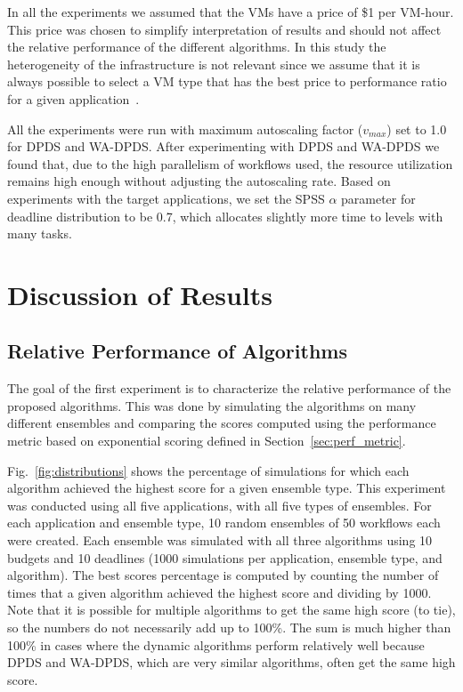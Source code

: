 \documentclass[conference]{IEEEtran}
\begin{document}
In all the experiments we assumed that the VMs have a price of \$1 per VM-hour.
This price was chosen to simplify interpretation of results and should not
affect the relative performance of the different algorithms. In this study the
heterogeneity of the infrastructure is not relevant since we assume that it is
always possible to select a VM type that has the best price to performance ratio
for a given application~\cite{Juve2009}.

All the experiments were run with maximum autoscaling factor ($v_{max}$) set to
1.0 for DPDS and WA-DPDS. After experimenting with DPDS and WA-DPDS we found
that, due to the high parallelism of workflows used, the resource utilization
remains high enough without adjusting the autoscaling rate. Based on experiments
with the target applications, we set the SPSS $\alpha$ parameter for deadline
distribution to be 0.7, which allocates slightly more time to levels with many
tasks.







\section{Discussion of Results}
\label{sec:results}



\subsection{Relative Performance of Algorithms}

The goal of the first experiment is to characterize the relative performance
of the proposed algorithms. This was done by simulating the algorithms on many
different ensembles and comparing the scores computed using the
performance metric based on exponential scoring defined in
Section~\ref{sec:perf_metric}.

Fig.~\ref{fig:distributions} shows the percentage of simulations for which
each algorithm achieved the highest score for a given ensemble type. This
experiment was conducted using all five applications, with all five types of
ensembles. For each application and ensemble type, 10 random ensembles of 50
workflows each were created. Each ensemble was simulated with all three
algorithms using 10 budgets and 10 deadlines (1000 simulations per
application, ensemble type, and algorithm). The best scores percentage is
computed by counting the number of times that a given algorithm achieved the
highest score and dividing by 1000. Note that it is possible for multiple
algorithms to get the same high score (to tie), so the numbers do not
necessarily add up to 100\%. The sum is much higher than 100\% in cases where
the dynamic algorithms perform relatively well because DPDS and WA-DPDS, which
are very similar algorithms, often get the same high score.
\end{document}
